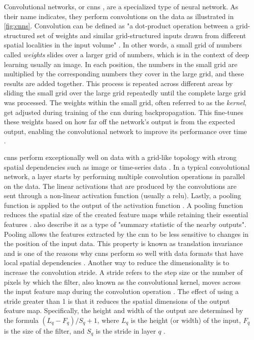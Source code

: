 Convolutional networks, or \glspl{cnn} \cite{lecun1998GradientbasedLearningApplied}, are a specialized type of neural network.
As their name indicates, they perform convolutions on the data as illustrated in \autoref{fig:cnns}.
Convolution can be defined as "a dot-product operation between a grid-structured set of weights and similar grid-structured inputs drawn from
different spatial localities in the input volume" \cite[p. 316]{aggarwal2018NeuralNetworksDeep}.
In other words, a small grid of numbers called \textit{weights} slides over a larger grid of numbers, which is in the context of deep learning usually an image.
In each position, the numbers in the small grid are multiplied by the corresponding numbers they cover in the large grid, and these results are added together. 
This process is repeated across different areas by sliding the small grid over the large grid repeatedly until the complete large grid was processed.
The weights within the small grid, often referred to as the \textit{kernel}, get adjusted during training of the \gls{cnn} during backpropagation. 
This fine-tunes these weights based on how far off the network's output is from the expected output, enabling the convolutional network to improve its performance over time \cite{aggarwal2018NeuralNetworksDeep, Goodfellow-et-al-2016}.

\glspl{cnn} perform exceptionally well on data with a grid-like topology with strong spatial dependencies such as image or time-series data \cite{aggarwal2018NeuralNetworksDeep, Goodfellow-et-al-2016}.
In a typical convolutional network, a layer starts by performing multiple convolution operations in parallel on the data.
The linear activations that are produced by the convolutions are sent through a non-linear activation function (usually a \gls{relu}).
Lastly, a pooling function is applied to the output of the activation function \cite{aggarwal2018NeuralNetworksDeep}.
A pooling function reduces the spatial size of the created feature maps while retaining their essential features \cite{Goodfellow-et-al-2016, aggarwal2018NeuralNetworksDeep}.
\textcite[p. 335]{Goodfellow-et-al-2016} also describe it as a type of "summary statistic of the nearby outputs".
Pooling allows the features extracted by the \gls{cnn} to be less sensitive to changes in the position of the input data.
This property is known as translation invariance and is one of the reasons why \glspl{cnn} perform so well with data formats that have local spatial dependencies \cite{Goodfellow-et-al-2016, aggarwal2018NeuralNetworksDeep}.
Another way to reduce the dimensionality is to increase the convolution stride.
A stride refers to the step size or the number of pixels by which the filter, also known as the convolutional kernel, moves across the input feature map during the convolution operation \cite{aggarwal2018NeuralNetworksDeep}.
The effect of using a stride greater than 1 is that it reduces the spatial dimensions of the output feature map. 
Specifically, the height and width of the output are determined by the formula $(L_q - F_q)/S_q + 1$, where $L_q$ is the height (or width) of the input, $F_q$ is the size of the filter, and $S_q$ is the stride in layer $q$ \cite[p. 324]{aggarwal2018NeuralNetworksDeep}.

